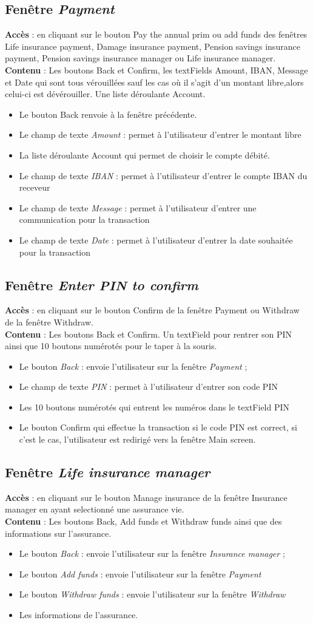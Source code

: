 \documentclass{article}
\newcommand{\navbutton}[2]{Le bouton \emph{#1} : envoie l'utilisateur sur la fenêtre \emph{#2}}
\newcommand{\textfield}[2]{Le champ de texte \emph{#1} : permet à l'utilisateur d'entrer #2}
\newcommand{\access}[1]{ \noindent\textbf{Accès} : #1 \\}
\newcommand{\content}[1]{\textbf{Contenu} : #1}
\begin{document}
\subsection{Fenêtre \emph{Payment}}
\access{en cliquant sur le bouton Pay the annual prim ou add funds des fenêtres Life insurance payment, Damage insurance payment, Pension savings insurance payment, Pension savings insurance manager ou Life insurance manager.}
\content{Les boutons Back et Confirm, les textFields Amount, IBAN, Message et Date qui sont tous vérouillées sauf les cas où il s'agit d'un montant libre,alors celui-ci est dévérouiller. Une liste déroulante Account.}
\begin{itemize}
\item Le bouton Back renvoie à la fenêtre précédente.
\item \textfield{Amount}{le montant libre}
\item La liste déroulante Account qui permet de choisir le compte débité.
\item \textfield{IBAN}{le compte IBAN du receveur}
\item \textfield{Message}{une communication pour la transaction}
\item \textfield{Date}{la date souhaitée pour la transaction}
\end{itemize}


\subsection{Fenêtre \emph{Enter PIN to confirm}}
\access{en cliquant sur le bouton Confirm de la fenêtre Payment ou Withdraw de la fenêtre Withdraw.}
\content{Les boutons Back et Confirm. Un textField pour rentrer son PIN ainsi que 10 boutons numérotés pour le taper à la souris.}
\begin{itemize}
\item \navbutton{Back}{Payment} ;
\item \textfield{PIN}{son code PIN}
\item Les 10 boutons numérotés qui entrent les numéros dans le textField PIN
\item Le bouton Confirm qui effectue la transaction si le code PIN est correct, si c'est le cas, l'utilisateur est redirigé vers la fenêtre Main screen.
\end{itemize}


\subsection{Fenêtre \emph{Life insurance manager}}
\access{en cliquant sur le bouton Manage insurance de la fenêtre Insurance manager en ayant selectionné une assurance vie.}
\content{Les boutons Back, Add funds et Withdraw funds ainsi que des informations sur l'assurance.}
\begin{itemize}
\item \navbutton{Back}{Insurance manager} ;
\item \navbutton{Add funds}{Payment}
\item \navbutton{Withdraw funds}{Withdraw}
\item Les informations de l'assurance.
\end{itemize}
\end{document}
